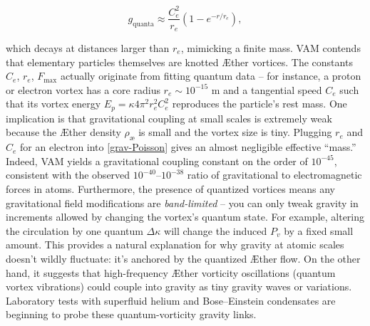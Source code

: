 \begin{equation}
    g_{\text{quanta}} \approx \frac{C_e^2}{r_e} \left(1 - e^{-r/r_e} \right),
    \label{eq:g_quanta}
\end{equation}

which decays at distances larger than $r_e$, mimicking a finite mass.
VAM contends that elementary particles themselves are knotted Æther vortices. The constants $C_e$, $r_e$, $F_{\max}$ actually originate from fitting quantum data – for instance, a proton or electron vortex has a core radius $r_e \sim 10^{-15}$ m and a tangential speed $C_e$ such that its vortex energy $E_p = \kappa 4\pi^2 r_e^2 C_e^2$ reproduces the particle’s rest mass. One implication is that gravitational coupling at small scales is extremely weak because the Æther density $\rho_{\text{\ae}}$ is small and the vortex size is tiny. Plugging $r_e$ and $C_e$ for an electron into \eqref{grav-Poisson} gives an almost negligible effective “mass.” Indeed, VAM yields a gravitational coupling constant on the order of $10^{-45}$, consistent with the observed $10^{-40}$–$10^{-38}$ ratio of gravitational to electromagnetic forces in atoms. Furthermore, the presence of quantized vortices means any gravitational field modifications are \textit{band-limited} – you can only tweak gravity in increments allowed by changing the vortex’s quantum state. For example, altering the circulation by one quantum $\Delta \kappa$ will change the induced $P_v$ by a fixed small amount. This provides a natural explanation for why gravity at atomic scales doesn’t wildly fluctuate: it’s anchored by the quantized Æther flow. On the other hand, it suggests that high-frequency Æther vorticity oscillations (quantum vortex vibrations) could couple into gravity as tiny gravity waves or variations. Laboratory tests with superfluid helium and Bose–Einstein condensates are beginning to probe these quantum-vorticity gravity links.


